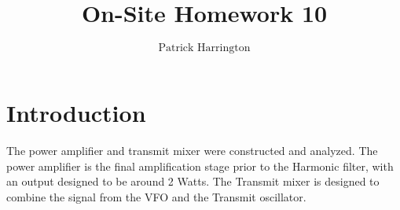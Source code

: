 \documentclass{./cls/hw}
\title{On-Site Homework 10}
\author{$\boxed{\text{Patrick Harrington}}$}
\begin{document}
\maketitle
\section*{Introduction}
The power amplifier and transmit mixer were constructed and analyzed. The
power amplifier is the final amplification stage prior to the Harmonic
filter, with an output designed to be around 2 Watts. The Transmit mixer is
designed to combine the signal from the VFO and the Transmit oscillator.

%
%
%   
%
%
%


\newpage

\end{document}
